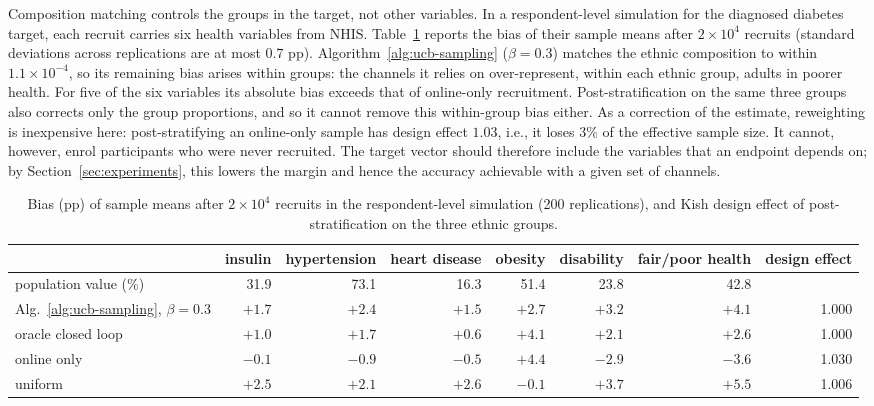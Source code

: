 \documentclass[twoside]{article}
\begin{document}
Composition matching controls the groups in the target, not other
variables. In a respondent-level simulation for the diagnosed diabetes target, each
recruit carries six health variables from NHIS. Table~\ref{tab:downstream}
reports the bias of their sample means after \(2\times10^4\) recruits
(standard deviations across replications are at most \(0.7\) pp).
Algorithm~\ref{alg:ucb-sampling} (\(\beta=0.3\)) matches the ethnic
composition to within \(1.1\times10^{-4}\), so its remaining bias arises
within groups: the
channels it relies on over-represent, within each ethnic group, adults in
poorer health. For five of the six variables its absolute bias exceeds
that of online-only recruitment. Post-stratification on the same three
groups also corrects only the group proportions, and so it cannot remove
this within-group bias either. As a correction of the estimate,
reweighting is inexpensive here: post-stratifying an online-only sample
has design effect \(1.03\), i.e., it loses \(3\%\) of the effective sample
size. It cannot, however, enrol participants who were never recruited.
The target vector should therefore include the variables that an
endpoint depends on; by Section~\ref{sec:experiments}, this lowers the
margin and hence the accuracy achievable with a given set of channels.

\begin{table}[!ht]
\caption{Bias (pp) of sample means after \(2\times10^4\) recruits in the
respondent-level simulation (200 replications), and Kish design effect of
post-stratification on the three ethnic groups.}
\label{tab:downstream}
\centering\small
\setlength{\tabcolsep}{4.5pt}
\begin{tabular}{lrrrrrrr}
\hline
 & insulin & hypertension & heart disease & obesity & disability & fair/poor health & design effect\\
\hline
population value (\%) & 31.9 & 73.1 & 16.3 & 51.4 & 23.8 & 42.8 & \\
Alg.~\ref{alg:ucb-sampling}, \(\beta=0.3\) & \(+1.7\) & \(+2.4\) & \(+1.5\) & \(+2.7\) & \(+3.2\) & \(+4.1\) & 1.000\\
oracle closed loop & \(+1.0\) & \(+1.7\) & \(+0.6\) & \(+4.1\) & \(+2.1\) & \(+2.6\) & 1.000\\
online only & \(-0.1\) & \(-0.9\) & \(-0.5\) & \(+4.4\) & \(-2.9\) & \(-3.6\) & 1.030\\
uniform & \(+2.5\) & \(+2.1\) & \(+2.6\) & \(-0.1\) & \(+3.7\) & \(+5.5\) & 1.006\\
\hline
\end{tabular}
\end{table}

\FloatBarrier
\end{document}
